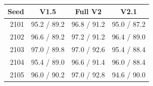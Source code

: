 \par\noindent\begin{minipage}{\columnwidth}
\label{tab:v21seeds}\centering\small
\begin{tabular}{rccc}\toprule Seed & V1.5 & Full V2 & V2.1\\\midrule
2101 & 95.2 / 89.2 & 96.8 / 91.2 & 95.0 / 87.2\\
2102 & 96.6 / 89.2 & 97.2 / 91.2 & 96.4 / 89.0\\
2103 & 97.0 / 89.8 & 97.0 / 92.6 & 95.4 / 88.4\\
2104 & 95.4 / 89.0 & 96.6 / 91.4 & 96.0 / 88.4\\
2105 & 96.0 / 90.2 & 97.0 / 92.8 & 94.6 / 90.0\\
\bottomrule\end{tabular}
\end{minipage}\par\medskip

